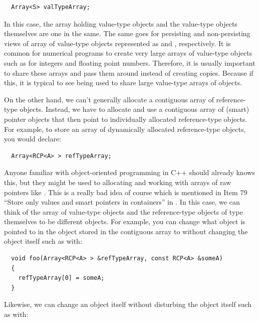 \documentclass[pdf,ps2pdf,11pt]{SANDreport}
\begin{document}
{\small\begin{verbatim}
  Array<S> valTypeArray;
\end{verbatim}}

In this case, the array holding value-type objects and the value-type
objects themselves are one in the same.  The same goes for persisting
and non-persisting views of array of value-type objects represented as
{} and {},
respectively.  It is common for numerical programs to create very
large arrays of value-type objects such as for integers and floating
point numbers.  Therefore, it is usually important to share these
arrays and pass them around instead of creating copies.  Because if
this, it is typical to see {} being used
to share large value-type arrays of objects.

On the other hand, we can't generally allocate a contiguous array of
reference-type objects.  Instead, we have to allocate and use a
contiguous array of (smart) pointer objects that then point to
individually allocated reference-type objects.  For example, to store
an array of dynamically allocated reference-type objects, you would
declare:

{\small\begin{verbatim}
  Array<RCP<A> > refTypeArray;
\end{verbatim}}

Anyone familiar with object-oriented programming in C++ should already
knows this, but they might be used to allocating and working with
arrays of raw pointers like {}.  This is a
really bad idea of course which is mentioned in Item 79 ``Store only
values and smart pointers in containers'' in
{}\cite{C++CodingStandards05}.  In this case, we can think of the
array of {} value-type objects and the reference-type
objects of type {} themselves to be different objects.  For
example, you can change what {} object is pointed to in the
{} object stored in the contiguous array to without
changing the {} object itself such as with:

{\small\begin{verbatim}
  void foo(Array<RCP<A> > &refTypeArray, const RCP<A> &someA)
  {
    refTypeArray[0] = someA;
  }
\end{verbatim}}

Likewise, we can change an {} object itself without
disturbing the {} object itself such as with:
\end{document}
